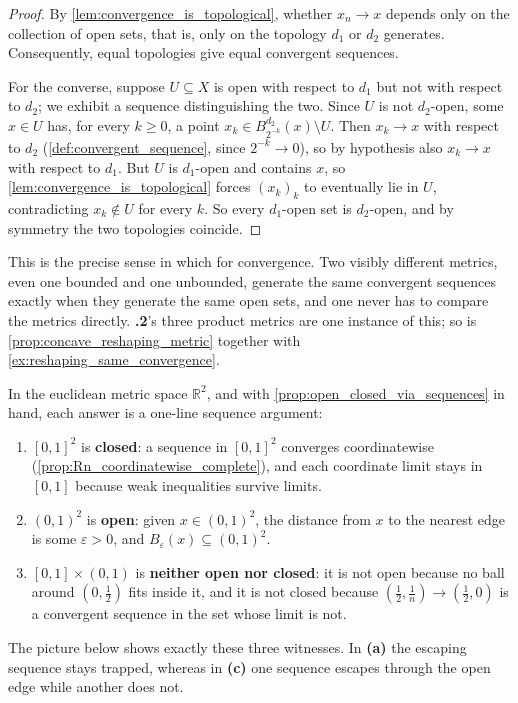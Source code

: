 \begin{proof}
By \cref{lem:convergence_is_topological}, whether $x_n \to x$ depends only on the collection of
open sets, that is, only on the topology $d_1$ or $d_2$ generates. Consequently, equal topologies
give equal convergent sequences.

For the converse, suppose $U \subseteq X$ is open with respect to $d_1$ but not with respect to
$d_2$; we exhibit a sequence distinguishing the two. Since $U$ is not $d_2$-open, some $x \in U$
has, for every $k \geq 0$, a point $x_k \in B^{d_2}_{2^{-k}}(x) \setminus U$. Then $x_k \to x$
with respect to $d_2$ (\cref{def:convergent_sequence}, since $2^{-k}\to0$), so by hypothesis also
$x_k \to x$ with respect to $d_1$. But $U$ is $d_1$-open and contains $x$, so
\cref{lem:convergence_is_topological} forces $(x_k)_k$ to eventually lie in $U$, contradicting
$x_k \notin U$ for every $k$. So every $d_1$-open set is $d_2$-open, and by symmetry the two
topologies coincide.
\end{proof}

\begin{remark}
This is the precise sense in which  for
convergence. Two visibly different metrics, even one bounded and one unbounded, generate the same
convergent sequences exactly when they generate the same open sets, and one never has to compare
the metrics directly. \textbf{.2}'s three product metrics are one instance of this; so is
\cref{prop:concave_reshaping_metric} together with \cref{ex:reshaping_same_convergence}.
\end{remark}

\begin{example}
\label{ex:open_closed_neither_R2}
In the euclidean metric space $\mathbb{R}^2$, and with
\cref{prop:open_closed_via_sequences} in hand, each answer is a one-line sequence argument:
\begin{enumerate}[label=\textbf{(\alph*)}]
  \item $[0,1]^2$ is \textbf{closed}: a sequence in $[0,1]^2$ converges coordinatewise
    (\cref{prop:Rn_coordinatewise_complete}), and each coordinate limit stays in $[0,1]$ because
    weak inequalities survive limits.
  \item $(0,1)^2$ is \textbf{open}: given $x \in (0,1)^2$, the distance from $x$ to the nearest
    edge is some $\varepsilon>0$, and $B_\varepsilon(x) \subseteq (0,1)^2$.
  \item $[0,1] \times (0,1)$ is \textbf{neither open nor closed}: it is not open because no ball
    around $(0,\tfrac12)$ fits inside it, and it is not closed because
    $(\tfrac12, \tfrac1n) \to (\tfrac12, 0)$ is a convergent sequence in the set whose limit is
    not.
\end{enumerate}
The picture below shows exactly these three witnesses. In \textbf{(a)} the escaping sequence stays
trapped, whereas in \textbf{(c)} one sequence escapes through the open edge while another does
not.
\end{example}


